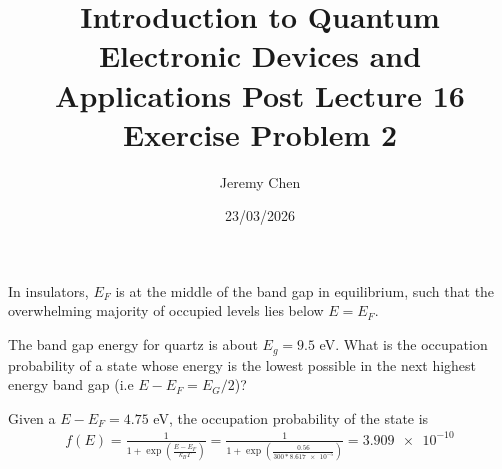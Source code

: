 \documentclass[10pt,letterpaper]{article}
\title{Introduction to Quantum Electronic Devices and Applications Post Lecture 16 Exercise Problem 2}
\date{23/03/2026}
\author{Jeremy Chen}
\begin{document}
	\maketitle

\noindent In insulators, $E_{F}$ is at the middle of the band gap in equilibrium, such that the overwhelming majority of occupied levels lies below $E = E_{F}$.

\noindent The band gap energy for quartz is about $E_{g} = 9.5$ eV. What is the occupation probability of a state whose energy is the lowest possible in the next highest energy band gap (i.e $E - E_{F} = E_{G}/2$)? 

\color{violet}
Given a $E - E_{F} = 4.75$ eV, the occupation probability of the state is
\begin{gather*}
f(E) = \frac{1}{1 + \exp{\left( \frac{E - E_{F}}{k_{B}T} \right)}} = \frac{1}{1 + \exp{\left( \frac{0.56}{300 * \num{8.617e-5}} \right)}} = \num{3.909e-10}
\end{gather*}
\color{black}
\end{document}
